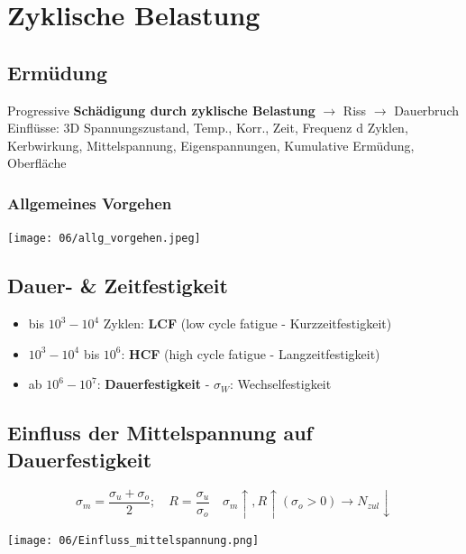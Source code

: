 \section{Zyklische Belastung}
    \subsection{Ermüdung}
        Progressive \textbf{Schädigung durch zyklische Belastung} $\rightarrow$ Riss $\rightarrow$ Dauerbruch\\
        Einflüsse: 3D Spannungszustand, Temp., Korr., Zeit, Frequenz d Zyklen, Kerbwirkung, Mittelspannung, Eigenspannungen, Kumulative Ermüdung, Oberfläche
        \subsubsection{Allgemeines Vorgehen}
            \texttt{[image: 06/allg\_vorgehen.jpeg]}
            \vspace{-4mm}
        \subsection{Dauer- \& Zeitfestigkeit}
            \begin{minipage}{\linewidth}
                \begin{itemize}
                    \item bis $10^3-10^4$ Zyklen: \textbf{LCF} (low cycle fatigue - Kurzzeitfestigkeit)
                    \item $10^3-10^4$ bis $10^6$: \textbf{HCF} (high cycle fatigue - Langzeitfestigkeit)
                    \item ab $10^6-10^7$: \textbf{Dauerfestigkeit} - $\sigma_W$: Wechselfestigkeit
                \end{itemize}
            \end{minipage}
    \subsection{Einfluss der Mittelspannung auf Dauerfestigkeit}
        \[\sigma_m=\frac{\sigma_u+\sigma_o}{2}; \quad R=\frac{\sigma_u}{\sigma_o} \quad \sigma_m \uparrow, R \uparrow (\sigma_o >0) \rightarrow N_{zul} \downarrow\]
        \begin{center}
            \vspace{-1mm}
            \texttt{[image: 06/Einfluss\_mittelspannung.png]}
        \end{center}

